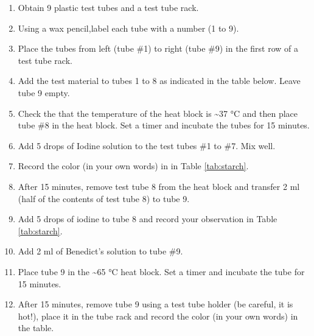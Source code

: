 \documentclass[]{book}
\providecommand{\tightlist}{%
  \setlength{\itemsep}{0pt}\setlength{\parskip}{0pt}}
\theoremstyle{definition}
\theoremstyle{definition}
\theoremstyle{definition}
\theoremstyle{remark}
\begin{document}
\begin{enumerate}
\def\labelenumi{\arabic{enumi}.}
\tightlist
\item
  Obtain 9 plastic test tubes and a test tube rack.
\item
  Using a wax pencil,label each tube with a number (1 to 9).
\item
  Place the tubes from left (tube \#1) to right (tube \#9) in the first
  row of a test tube rack.
\item
  Add the test material to tubes 1 to 8 as indicated in the table below.
  Leave tube 9 empty.
\item
  Check the that the temperature of the heat block is
  \textasciitilde{}37 °C and then place tube \#8 in the heat block. Set
  a timer and incubate the tubes for 15 minutes.
\item
  Add 5 drops of Iodine solution to the test tubes \#1 to \#7. Mix well.
\item
  Record the color (in your own words) in in Table \ref{tab:starch}.
\item
  After 15 minutes, remove test tube 8 from the heat block and transfer
  2 ml (half of the contents of test tube 8) to tube 9.
\item
  Add 5 drops of iodine to tube 8 and record your observation in Table
  \ref{tab:starch}.
\item
  Add 2 ml of Benedict's solution to tube \#9.
\item
  Place tube 9 in the \textasciitilde{}65 °C heat block. Set a timer and
  incubate the tube for 15 minutes.
\item
  After 15 minutes, remove tube 9 using a test tube holder (be careful,
  it is hot!), place it in the tube rack and record the color (in your
  own words) in the table.
\end{enumerate}
\end{document}
